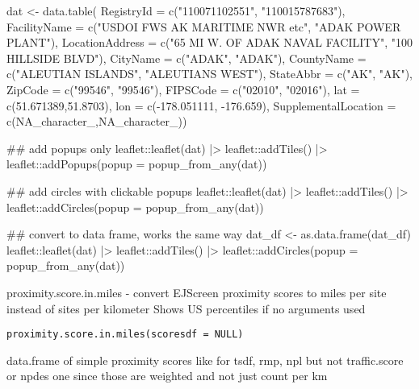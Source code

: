 \documentclass[a4paper]{book}
\begin{document}
%
\begin{Examples}
\begin{ExampleCode}
 
 dat <- data.table(
   RegistryId = c("110071102551", "110015787683"),
   FacilityName = c("USDOI FWS AK MARITIME NWR etc", "ADAK POWER PLANT"),
   LocationAddress = c("65 MI W. OF ADAK NAVAL FACILITY", "100 HILLSIDE BLVD"),
   CityName = c("ADAK", "ADAK"),
   CountyName = c("ALEUTIAN ISLANDS", "ALEUTIANS WEST"),
   StateAbbr = c("AK", "AK"),
   ZipCode = c("99546", "99546"),
   FIPSCode = c("02010", "02016"),
   lat = c(51.671389,51.8703), lon = c(-178.051111, -176.659),
   SupplementalLocation = c(NA_character_,NA_character_))
 
 ## add popups only
 leaflet::leaflet(dat) |> leaflet::addTiles() |> leaflet::addPopups(popup = popup_from_any(dat))
 
 ## add circles with clickable popups
 leaflet::leaflet(dat) |> leaflet::addTiles() |> leaflet::addCircles(popup = popup_from_any(dat))
 
 ## convert to data frame, works the same way 
 dat_df <- as.data.frame(dat_df)
 leaflet::leaflet(dat) |> leaflet::addTiles() |> leaflet::addCircles(popup = popup_from_any(dat))
\end{ExampleCode}
\end{Examples}
%
\begin{Description}\relax
proximity.score.in.miles - convert EJScreen proximity scores to miles per site instead of sites per kilometer
Shows US percentiles if no arguments used
\end{Description}
%
\begin{Usage}
\begin{verbatim}
proximity.score.in.miles(scoresdf = NULL)
\end{verbatim}
\end{Usage}
%
\begin{Arguments}
\begin{ldescription}
\item[\code{scoresdf}] data.frame of simple proximity scores like for tsdf, rmp, npl
but not traffic.score or npdes one since those are weighted and not just count per km
\end{ldescription}
\end{Arguments}
\end{document}
